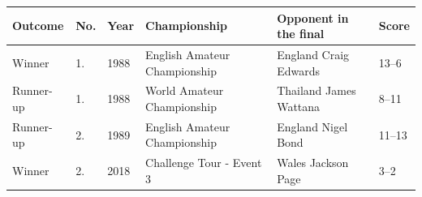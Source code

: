 \documentclass{article}
\begin{document}
\begin{tabular}{llllll}
\toprule
Outcome & No. & Year & Championship & Opponent in the final & Score \\
\midrule
Winner & 1. & 1988 & English Amateur Championship & England Craig Edwards & 13–6 \\
Runner-up & 1. & 1988 & World Amateur Championship & Thailand James Wattana & 8–11 \\
Runner-up & 2. & 1989 & English Amateur Championship & England Nigel Bond & 11–13 \\
Winner & 2. & 2018 & Challenge Tour - Event 3 & Wales Jackson Page & 3–2 \\
\bottomrule
\end{tabular}
\end{document}
